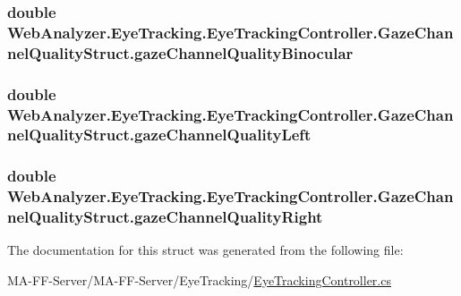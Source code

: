 \subsubsection[{gaze\+Channel\+Quality\+Binocular}]{\setlength{\rightskip}{0pt plus 5cm}double Web\+Analyzer.\+Eye\+Tracking.\+Eye\+Tracking\+Controller.\+Gaze\+Channel\+Quality\+Struct.\+gaze\+Channel\+Quality\+Binocular}\label{struct_web_analyzer_1_1_eye_tracking_1_1_eye_tracking_controller_1_1_gaze_channel_quality_struct_a9db76be67045be6fb3e79f22edb0e940}
\hypertarget{struct_web_analyzer_1_1_eye_tracking_1_1_eye_tracking_controller_1_1_gaze_channel_quality_struct_afa5448800111088fe037c0ca42df3dcc}{}
\subsubsection[{gaze\+Channel\+Quality\+Left}]{\setlength{\rightskip}{0pt plus 5cm}double Web\+Analyzer.\+Eye\+Tracking.\+Eye\+Tracking\+Controller.\+Gaze\+Channel\+Quality\+Struct.\+gaze\+Channel\+Quality\+Left}\label{struct_web_analyzer_1_1_eye_tracking_1_1_eye_tracking_controller_1_1_gaze_channel_quality_struct_afa5448800111088fe037c0ca42df3dcc}
\hypertarget{struct_web_analyzer_1_1_eye_tracking_1_1_eye_tracking_controller_1_1_gaze_channel_quality_struct_aecddd9ebc34deb03015fbf0aaeae7092}{}
\subsubsection[{gaze\+Channel\+Quality\+Right}]{\setlength{\rightskip}{0pt plus 5cm}double Web\+Analyzer.\+Eye\+Tracking.\+Eye\+Tracking\+Controller.\+Gaze\+Channel\+Quality\+Struct.\+gaze\+Channel\+Quality\+Right}\label{struct_web_analyzer_1_1_eye_tracking_1_1_eye_tracking_controller_1_1_gaze_channel_quality_struct_aecddd9ebc34deb03015fbf0aaeae7092}


The documentation for this struct was generated from the following file\+:\begin{DoxyCompactItemize}
\item 
M\+A-\/\+F\+F-\/\+Server/\+M\+A-\/\+F\+F-\/\+Server/\+Eye\+Tracking/\hyperlink{_eye_tracking_controller_8cs}{Eye\+Tracking\+Controller.\+cs}\end{DoxyCompactItemize}
